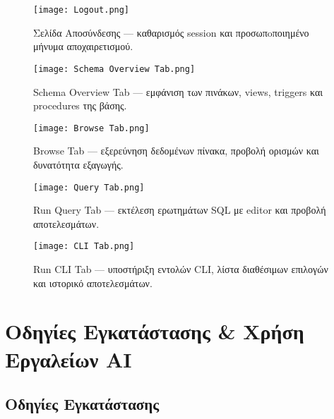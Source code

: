 \documentclass[13pt]{extarticle}
\begin{document}
\vspace{1.5cm}
\begin{figure}[H]
    \centering
    \texttt{[image: Logout.png]}
    \caption{Σελίδα Αποσύνδεσης — καθαρισμός session και προσωπoποιημένο μήνυμα αποχαιρετισμού.}
\end{figure}

\clearpage
\begin{figure}[H]
    \centering
    \texttt{[image: Schema Overview Tab.png]}
    \caption{Schema Overview Tab — εμφάνιση των πινάκων, views, triggers και procedures της βάσης.}
\end{figure}

\vspace{1.5cm}
\begin{figure}[H]
    \centering
    \texttt{[image: Browse Tab.png]}
    \caption{Browse Tab — εξερεύνηση δεδομένων πίνακα, προβολή ορισμών και δυνατότητα εξαγωγής.}
\end{figure}

\clearpage
\begin{figure}[H]
    \centering
    \texttt{[image: Query Tab.png]}
    \caption{Run Query Tab — εκτέλεση ερωτημάτων SQL με editor και προβολή αποτελεσμάτων.}
\end{figure}

\vspace{1.5cm}
\begin{figure}[H]
    \centering
    \texttt{[image: CLI Tab.png]}
    \caption{Run CLI Tab — υποστήριξη εντολών CLI, λίστα διαθέσιμων επιλογών και ιστορικό αποτελεσμάτων.}
\end{figure}


\clearpage
\section{Οδηγίες Εγκατάστασης \& Χρήση Εργαλείων AI}

\subsection{Οδηγίες Εγκατάστασης}
\end{document}
